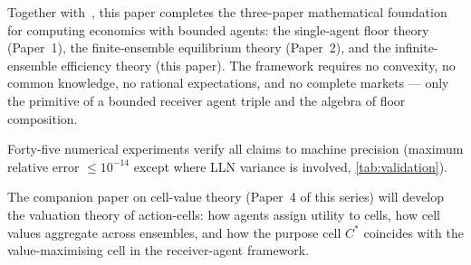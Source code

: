 \documentclass[twocolumn,11pt,a4paper]{article}
\theoremstyle{remark}
\begin{document}
Together with~\cite{sachikonye2025agents,sachikonye2025market}, this paper
completes the three-paper mathematical foundation for computing economics with
bounded agents: the single-agent floor theory (Paper~1), the finite-ensemble
equilibrium theory (Paper~2), and the infinite-ensemble efficiency theory
(this paper).  The framework requires no convexity, no common knowledge, no
rational expectations, and no complete markets — only the primitive of a
bounded receiver agent triple and the algebra of floor composition.

Forty-five numerical experiments verify all claims to machine precision
(maximum relative error $\le 10^{-14}$ except where LLN variance is
involved, \cref{tab:validation}).

The companion paper on cell-value theory (Paper~4 of this series) will
develop the valuation theory of action-cells: how agents assign utility to
cells, how cell values aggregate across ensembles, and how the purpose cell
$C^*$ coincides with the value-maximising cell in the receiver-agent
framework.



\end{document}
